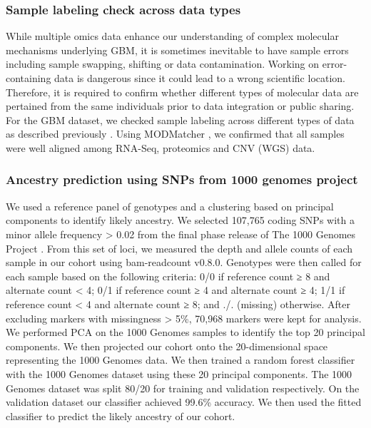 \subsubsection{Sample labeling check across data types}
While multiple omics data enhance our understanding of complex molecular mechanisms underlying GBM, it is sometimes inevitable to have sample errors including sample swapping, shifting or data contamination. Working on error-containing data is dangerous since it could lead to a wrong scientific location. Therefore, it is required to confirm whether different types of molecular data are pertained from the same individuals prior to data integration or public sharing. For the GBM dataset, we checked sample labeling across different types of data as described previously \cite{clarkdj_zhangh:IntegratedProteogenomic2019}. Using MODMatcher \cite{yoos_zhuj:MODMatcherMultiomics2014}, we confirmed that all samples were well aligned among RNA-Seq, proteomics and CNV (WGS) data.

\subsubsection{Ancestry prediction using SNPs from 1000 genomes project}
We used a reference panel of genotypes and a clustering based on principal components to identify likely ancestry. We selected 107,765 coding SNPs with a minor allele frequency > 0.02 from the final phase release of The 1000 Genomes Project \cite{1000genomesprojectconsortium_mcveanga:MapHuman2010}. From this set of loci, we measured the depth and allele counts of each sample in our cohort using bam-readcount v0.8.0. Genotypes were then called for each sample based on the following criteria: 0/0 if reference count ≥ 8 and alternate count < 4; 0/1 if reference count ≥ 4 and alternate count ≥ 4; 1/1 if reference count < 4 and alternate count ≥ 8; and ./. (missing) otherwise. After excluding markers with missingness > 5\%, 70,968 markers were kept for analysis. We performed PCA on the 1000 Genomes samples to identify the top 20 principal components. We then projected our cohort onto the 20-dimensional space representing the 1000 Genomes data. We then trained a random forest classifier with the 1000 Genomes dataset using these 20 principal components. The 1000 Genomes dataset was split 80/20 for training and validation respectively. On the validation dataset our classifier achieved 99.6\% accuracy. We then used the fitted classifier to predict the likely ancestry of our cohort.

